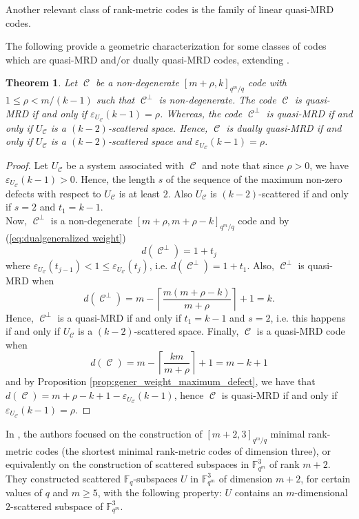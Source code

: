 \documentclass[11pt]{amsart}
\DeclareMathOperator{\C}{\mathcal{C}}
\newtheorem{theorem}{Theorem}[section]
\newcommand{\fqm}{\mathbb{F}_{q^m}}
\newcommand{\fq}{{\mathbb F}_{q}}
\begin{document}
Another relevant class of rank-metric codes is the family of linear quasi-MRD codes. 

The following provide a geometric characterization for some classes of codes which are quasi-MRD and/or dually quasi-MRD codes, extending \cite[Theorem 6.6]{marino2023evasive}.

\begin{theorem} \label{thm:quasi_MRD_k=3}
   Let $\C$ be a non-degenerate $[m+\rho,k]_{q^m/q}$ code with $1 \leq \rho < m/(k-1)$ such that $\C^{\perp}$ is non-degenerate. The code $\C$ is quasi-MRD if and only if $\varepsilon_{U_{\C}}(k-1)=\rho$. Whereas, the code $\C^\perp$ is quasi-MRD if and only if  $U_{\C}$ is a $(k-2)$-scattered space.
   Hence, $\C$ is dually quasi-MRD if and only if $U_{\C}$ is a $(k-2)$-scattered space and $\varepsilon_{U_{\C}}(k-1)=\rho$.
\end{theorem}
\begin{proof}
Let $U_{\C}$ be a system associated with $\C$ and note that since $\rho>0$, we have $\varepsilon_{U_{\C}}(k-1)>0$.
Hence, the length $s$ of the sequence of the maximum non-zero defects with respect to $U_{\C}$ is at least $2$. Also $U_{\C}$ is $(k-2)$-scattered if and only if $s=2$ and $t_1=k-1$.\\
Now, $\C^\perp$ is a non-degenerate $[m+\rho,m+\rho-k]_{q^m/q}$ code and 
 by (\ref{eq:dualgeneralized weight})
\[d(\C^\perp)=1+t_j\]
where $\varepsilon_{U_{\C}}(t_{j-1})<1\leq  \varepsilon_{U_{\C}}(t_{j})$, i.e. $d(\C^\perp)=1+t_1$. Also, $\C^\perp$ is quasi-MRD when 
\[d(\C^\perp)=m-\left\lceil \frac{m(m+\rho-k)}{m+\rho}\right\rceil+1=k.\]
Hence, $\C^\perp$ is a quasi-MRD if and only if $t_1=k-1$ and $s=2$, i.e. this happens if and only if $U_{\C}$ is a $(k-2)$-scattered space. 
Finally, $\C$ is a quasi-MRD code when 
\[d(\C)=m-\left\lceil \frac{km}{m+\rho}\right\rceil+1=m-k+1\]
and by Proposition \ref{prop:gener_weight_maximum_defect}, we have that $d(\C)=m+\rho-k+1-\varepsilon_{U_{\C}}(k-1)$, hence $\C$ is quasi-MRD if and only if $\varepsilon_{U_{\C}}(k-1)=\rho$. 
\end{proof}


In \cite{lia2024short}, the authors focused on the construction of $[m+2,3]_{q^m/q}$ minimal rank-metric codes (the shortest minimal rank-metric codes of dimension three), or equivalently on the construction of scattered subspaces in $\fqm^3$ of rank $m+2$.
They constructed scattered $\fq$-subspaces $U$ in $\fqm^3$ of dimension $m+2$, for certain values of $q$ and $m\geq 5$, with the following property: $U$ contains an $m$-dimensional $2$-scattered subspace of $\fqm^3$.
\end{document}
